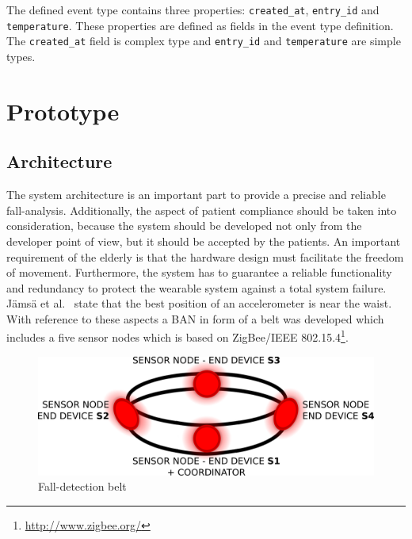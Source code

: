\documentclass[journal]{IEEEtran}
\begin{document}
The defined event type contains three properties: \texttt{\small{created\_at}},
\texttt{\small{entry\_id}} and \texttt{\small{temperature}}. These properties are defined as
fields in the event type definition. The \texttt{\small{created\_at}} field is complex
type and \texttt{\small{entry\_id}} and \texttt{\small{temperature}} are simple types. 

\section{Prototype}
\label{sec:basicprototype}

\subsection{Architecture}
\label{sub:basicprototypearchitecture}

The system architecture is an important part to provide a precise and reliable fall-analysis. 
Additionally, the aspect of patient compliance should be taken into consideration, because the 
system should be developed not only from the developer point of view, but it should be accepted 
by the patients. An important requirement of the elderly is that the hardware design must 
facilitate the freedom of movement. Furthermore, the system has to guarantee a reliable 
functionality and redundancy to protect the wearable system against
a total system failure. J{\"a}ms{\"a} et al.~\cite{jamsa2014fall} state that the best
position of an accelerometer is near the waist.
With reference to these aspects a BAN in form of a belt was developed which 
includes a five sensor nodes which is based on ZigBee/IEEE 802.15.4\footnote{\url{http://www.zigbee.org/}}.

\begin{figure}[!ht]
  \centering
  \includegraphics[scale=0.2]{./img/belt}
  \caption[Fall-detection belt]{Fall-detection belt~\cite{LaBlunda.2016,LaBlunda.2016b}}
  \label{fig:belt}
\end{figure}
\end{document}
